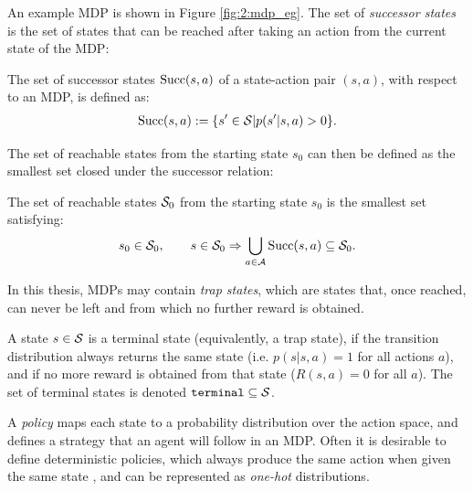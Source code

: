     An example MDP is shown in Figure \ref{fig:2:mdp_eg}. The set of \textit{successor states} is the set of states that can be reached after taking an action from the current state of the MDP:
    \begin{defn}
        \label{def:2:succ}
        The set of \textnormal{successor states} ${\textnormal{Succ}(s,a)}$ of a state-action pair $(s,a)$, with respect to an MDP, is defined as: 
        \begin{align}
            {\textnormal{Succ}(s,a)}:=\{s'\in\mathcal{S}|p(s'|s,a)>0\}. \label{eq:2:succ_def}
        \end{align}
    \end{defn}

    The set of reachable states from the starting state $s_0$ can then be defined as the smallest set closed under the successor relation:

    \begin{defn}
        \label{def:2:reachable}
        The set of \textnormal{reachable states} $\mathcal{S}_0$ from 
        the starting state $s_0$ is the smallest set satisfying:
        \begin{align}
            s_0 \in \mathcal{S}_0, \qquad 
            s \in \mathcal{S}_0 \Rightarrow \bigcup_{a \in \mathcal{A}} {\textnormal{Succ}(s,a)} \subseteq \mathcal{S}_0.
        \end{align}
    \end{defn}

    In this thesis, MDPs may contain \textit{trap states}, which are states that, once reached, can never be left and from which no further reward is obtained.
    \begin{defn}
        \label{def:2:terminal}
        A state $s\in\mathcal{S}$ is a \textnormal{terminal} state (equivalently, a \textnormal{trap} state), if the transition distribution always returns the same state (i.e. $p(s|s,a)=1$ for all actions $a$), and if no more reward is obtained from that state ($R(s,a)=0$ for all $a$). The set of terminal states is denoted ${\textnormal{\texttt{terminal}}}\subseteq\mathcal{S}$.
    \end{defn}

    A \textit{policy} maps each state  to a probability distribution over the action space, and defines a strategy that an agent will follow in an MDP.  Often it is desirable to define deterministic policies, which always produce the same action when given the same state , and can be represented as \textit{one-hot} distributions.

